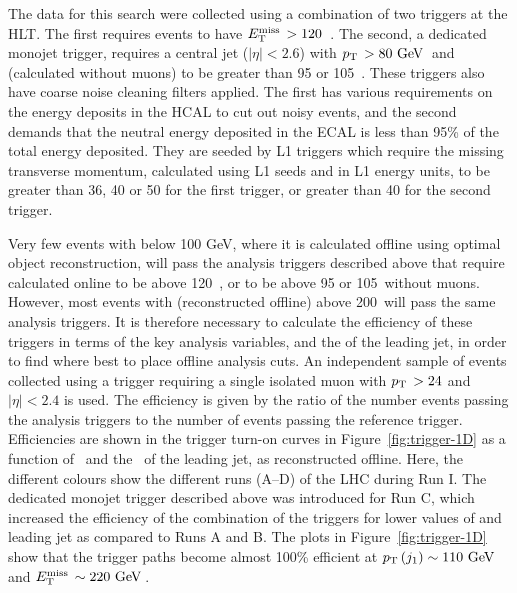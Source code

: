 The data for this search were collected using a combination of two triggers at the \ac{HLT}. 
The first requires events to have $E_{\text{T}}^{\text{miss}}\,>120$~\GeV.
The second, a dedicated monojet trigger, requires a central jet ($|\eta|<2.6$) with $p_{\text{T}}\,>80~\mathrm{GeV}\,$ and \MET 
(calculated without muons) to be greater than 95 or 105~\GeV. 
These triggers also have coarse noise cleaning filters applied. 
The first has various requirements on the energy deposits in the \ac{HCAL} to cut out noisy events, 
and the second demands that the neutral energy deposited in the \ac{ECAL} is less than 95\% of the total energy deposited.
They are seeded by \ac{L1} triggers which require the missing transverse momentum, calculated using \ac{L1} seeds and in \ac{L1} energy units, to be greater than 36, 40 or 50 for the first trigger, or greater than 40 for the second trigger. 


Very few events with \MET below 100 GeV, where it is calculated offline using optimal object reconstruction,  will pass the analysis triggers described above that require \MET calculated online to be above 120~\GeV, or to be above 95 or 105~\GeV without muons. 
However, most events with \MET (reconstructed offline) above 200~\GeV will pass the same analysis triggers. 
It is therefore necessary to calculate the efficiency of these triggers in terms of the key analysis variables, \MET and the \pt of the leading jet, in order to find where best to place offline analysis cuts. 
An independent sample of events collected using a trigger requiring a single isolated muon with $p_{\text{T}}\, > 24$ and $|\eta|<2.4$ is used.
The efficiency is given by the ratio of the number events passing the analysis triggers to the number of events passing the reference trigger. 
Efficiencies are shown in the trigger turn-on curves in Figure~\ref{fig:trigger-1D} as a function of \MET\ and the \pt\ of the leading jet, as reconstructed offline. 
Here, the different colours show the different runs (A--D) of the \ac{LHC} during Run I.
The dedicated monojet trigger described above was introduced for Run C, which increased the efficiency of the combination of the triggers for lower values of \MET and leading jet \pt as compared to Runs A and B. 
The plots in Figure~\ref{fig:trigger-1D} show that the trigger paths become almost 100\% efficient at $p_{\text{T}}\,(j_1)\sim110~\mathrm{GeV}\,$ and $E_{\text{T}}^{\text{miss}}\,\sim220~\mathrm{GeV}\,$.

